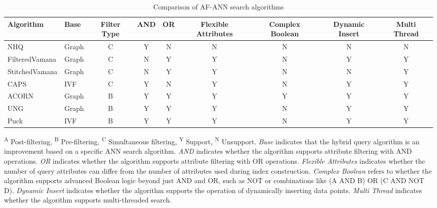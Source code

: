 \documentclass[sigconf, nonacm]{acmart}
\begin{document}
	
	\renewcommand{\arraystretch}{0.9}
	\begin{table}[t]
		\centering
		
		\caption{Comparison of AF-ANN search algorithms}
		\small
		\label{tab:compair_1}
		\begin{tabular}{|l|l|c|c|c|c|c|c|c|}
			\hline
			\textbf{Algorithm} & \textbf{Base} & \textbf{Filter Type} & \textbf{AND} & \textbf{OR} & \textbf{Flexible Attributes} & \textbf{Complex Boolean} & \textbf{Dynamic Insert} & \textbf{Multi Thread} \\
			\hline
			NHQ & Graph & C & Y & N& N& N & N & N \\
			FilteredVamana & Graph & C & N & Y & Y & N & Y & Y \\
			StitchedVamana & Graph & C & N & Y & Y & N & N & Y  \\
			CAPS & IVF & C & Y & N & Y & N & Y & Y \\
			ACORN & Graph & B & Y & Y & Y & Y & Y & Y \\
			UNG & Graph & B & Y & Y & Y & N & Y & Y \\ 
			Puck & IVF & B & Y & Y & Y & N & Y & Y \\
			
			\hline
			
		\end{tabular}
		
		
		\centering
		\footnotesize{
			\begin{minipage}{\linewidth}
				\vspace{0.1cm}
				\textsuperscript{A} Post-filtering, 
				\textsuperscript{B} Pre-filtering, 
				\textsuperscript{C} Simultaneous filtering, 
				\textsuperscript{Y} Support, 
				\textsuperscript{N} Unsupport. 
				\textit{Base} indicates that the hybrid query algorithm is an improvement based on a specific ANN search algorithm. 
				\textit{AND} indicates whether the algorithm supports attribute filtering with AND operations. 
				\textit{OR} indicates whether the algorithm supports attribute filtering with OR operations. 
				\textit{Flexible Attributes} indicates whether the number of query attributes can differ from the number of attributes used during index construction. 
				\textit{Complex Boolean} refers to whether the algorithm supports advanced Boolean logic beyond just AND and OR, such as NOT or combinations like (A AND B) OR (C AND NOT D). 
				\textit{Dynamic Insert} indicates whether the algorithm supports the operation of dynamically inserting data points.
				\textit{Multi Thread} indicates whether the algorithm supports multi-threaded search.
		\end{minipage}}
		
	\end{table}
	
\end{document}
